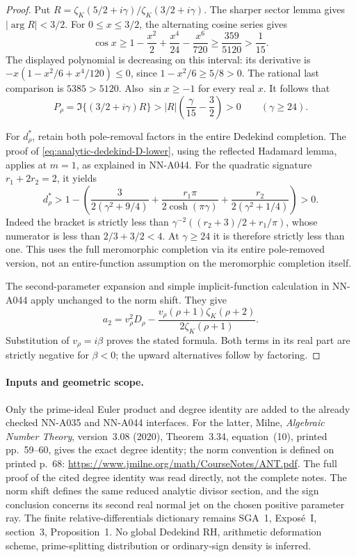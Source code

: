 \begin{proof}
Put \(R=\zeta_K(5/2+i\gamma)/\zeta_K(3/2+i\gamma)\).
The sharper sector lemma gives \(|\arg R|<3/2\).
For \(0\le x\le3/2\), the alternating cosine series gives
\[
 \cos x\ge 1-\frac{x^2}{2}+\frac{x^4}{24}-\frac{x^6}{720}
       \ge\frac{359}{5120}>\frac1{15}.
\]
The displayed polynomial is decreasing on this interval:
its derivative is
\(-x(1-x^2/6+x^4/120)\le0\), since
\(1-x^2/6\ge5/8>0\).
The rational last comparison is \(5385>5120\).
Also \(\sin x\ge-1\) for every real \(x\). It follows that
\[
 P_\rho=\Im\{(3/2+i\gamma)R\}
      >|R|\left(\frac{\gamma}{15}-\frac32\right)>0
               \qquad(\gamma\ge24).
\]

For \(d_\rho^*\), retain both pole-removal factors in the
entire Dedekind completion. The proof of
\eqref{eq:analytic-dedekind-D-lower}, using the reflected
Hadamard lemma, applies at \(m=1\), as explained in NN-A044.
For the quadratic signature \(r_1+2r_2=2\), it yields
\[
 d_\rho^*>
 1-\left(\frac{3}{2(\gamma^2+9/4)}
       +\frac{r_1\pi}{2\cosh(\pi\gamma)}
       +\frac{r_2}{2(\gamma^2+1/4)}\right)>0.
\]
Indeed the bracket is strictly less than
\(\gamma^{-2}((r_2+3)/2+r_1/\pi)\), whose numerator is
less than \(2/3+3/2<4\). At \(\gamma\ge24\) it is
therefore strictly less than one. This uses the full
meromorphic completion via its entire pole-removed version,
not an entire-function assumption on the meromorphic
completion itself.

The second-parameter expansion and simple implicit-function
calculation in NN-A044 apply unchanged to the norm shift.
They give
\[
 a_2=v_\rho^2D_\rho
       -\frac{v_\rho(\rho+1)\zeta_K(\rho+2)}
                                {2\zeta_K(\rho+1)}.
\]
Substitution of \(v_\rho=i\beta\) proves the stated formula.
Both terms in its real part are strictly negative for
\(\beta<0\); the upward alternatives follow by factoring.
\end{proof}

\paragraph{Inputs and geometric scope.}
Only the prime-ideal Euler product and degree identity are
added to the already checked NN-A035 and NN-A044 interfaces.
For the latter, Milne, \emph{Algebraic Number Theory},
version~3.08 (2020), Theorem~3.34, equation~(10),
printed pp.~59--60, gives the exact degree identity;
the norm convention is defined on printed p.~68:
\url{https://www.jmilne.org/math/CourseNotes/ANT.pdf}.
The full proof of the cited degree identity was read directly,
not the complete notes.
The norm shift defines the same reduced analytic divisor
section, and the sign conclusion concerns its second real
normal jet on the chosen positive parameter ray.
The finite relative-differentials dictionary remains
SGA~1, Expos\'e~I, section~3, Proposition~1.
No global Dedekind RH, arithmetic deformation scheme,
prime-splitting distribution or ordinary-sign density is
inferred.


